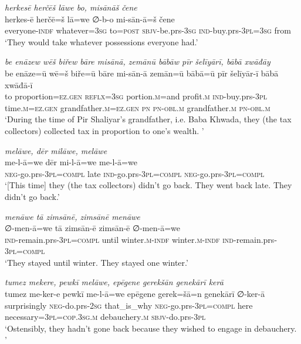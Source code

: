 \ea \label{BP.30}
\textit{herkesē herčēš lāwe bo, misānāš čene} \\ 
\gll herkes-ē herčē=š lā=we ∅-b-o mi-sān-ā=š čene \\ 
 everyone\textsc{-indf} whatever\textsc{=3sg} to\textsc{=\textsc{post}} \textsc{sbjv-}be.prs\textsc{-3sg} \textsc{ind-}buy.prs\textsc{-3pl}\textsc{=3sg} from \\ 
\glt `They would take whatever possessions everyone had.'
\z 
 
\ea \label{BP.31}
\textit{be enāzew wēš biřew bāre misānā, zemānū bābāw pīr šelīyārī, bābā xwāđāy} \\ 
\gll be enāze=ū wē=š biře=ū bāre mi-sān-ā zemān=ū bābā=ū pīr šelīyār-ī bābā xwāđā-ī \\ 
 to proportion\textsc{=ez.gen} \textsc{reflx}\textsc{=3sg} portion\textsc{.m}=and profit\textsc{.m} \textsc{ind-}buy.prs\textsc{-3pl} time\textsc{.m}\textsc{=ez.gen} grandfather\textsc{.m}\textsc{=ez.gen} \textsc{pn} \textsc{pn}\textsc{-obl}\textsc{.m} grandfather\textsc{.m} \textsc{pn}\textsc{-obl}\textsc{.m} \\ 
\glt `During the time of Pir Shaliyar’s grandfather, i.e. Baba Khwada, they (the tax collectors) collected tax in proportion to one’s wealth. '
\z 
 
\ea \label{BP.32}
\textit{melāwe, dēr milāwe, melāwe} \\ 
\gll me-l-ā=we dēr mi-l-ā=we me-l-ā=we \\ 
 \textsc{neg-}go.prs\textsc{-3pl}\textsc{=compl} late \textsc{ind-}go.prs\textsc{-3pl}\textsc{=compl} \textsc{neg-}go.prs\textsc{-3pl}\textsc{=compl} \\ 
\glt `[This time] they (the tax collectors) didn’t go back. They went back late. They didn’t go back.'
\z 
 
\ea \label{BP.33}
\textit{menāwe tā zimsānē, zimsānē menāwe} \\ 
\gll ∅-men-ā=we tā zimsān-ē zimsān-ē ∅-men-ā=we \\ 
 \textsc{ind-}remain.prs\textsc{-3pl}\textsc{=compl} until winter\textsc{.m}\textsc{-indf} winter\textsc{.m}\textsc{-indf} \textsc{ind-}remain.prs\textsc{-3pl}\textsc{=compl} \\ 
\glt `They stayed until winter. They stayed one winter.'
\z 
 
\ea \label{BP.34}
\textit{tumez mekere, pewkī melāwe, epēgene gerekšān genekārī kerā} \\ 
\gll tumez me-ker-e pewkī me-l-ā=we epēgene gerek=šā=n genekārī ∅-ker-ā \\ 
 surprisingly \textsc{neg-}do.prs-\textsc{2sg} that\_is\_why \textsc{neg-}go.prs\textsc{-3pl}\textsc{=compl} here necessary\textsc{=3pl}\textsc{=cop}\textsc{.3sg}\textsc{.m} debauchery\textsc{.m} \textsc{sbjv-}do.prs\textsc{-3pl} \\ 
\glt `Ostensibly, they hadn’t gone back because they wished to engage in debauchery. '
\z 
 

